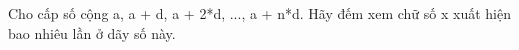 Cho cấp số cộng a, a + d, a + 2*d, ..., a + n*d.
Hãy đếm xem chữ số x xuất hiện bao nhiêu lần ở dãy số này.